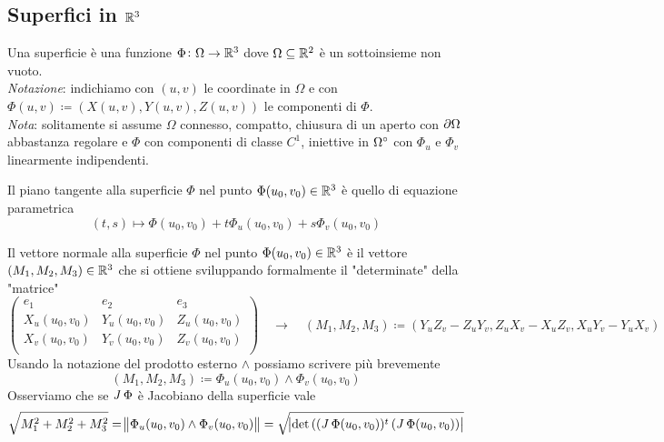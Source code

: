 
\subsection{Superfici in $ \mathbb{R}^3 $}
 
\begin{definition}[superficie]
	Una superficie è una funzione $ \Phi \colon \Omega \to \mathbb{R}^3 $ dove $ \Omega \subseteq \mathbb{R}^2 $ è un sottoinsieme non vuoto. \\
	\emph{Notazione}: indichiamo con $ (u, v) $ le coordinate in $ \Omega $ e con $ \Phi(u, v) \coloneqq (X(u, v), Y(u, v), Z(u, v)) $ le componenti di $ \Phi $.\\
	\emph{Nota}: solitamente si assume $ \Omega $ connesso, compatto, chiusura di un aperto con $ \partial{\Omega} $ abbastanza regolare e $ \Phi $ con componenti di classe $ C^1 $, iniettive in $ {\Omega}^{\circ} $ con $ \Phi_u $ e $ \Phi_v $ linearmente indipendenti. 
\end{definition}

\begin{definition}
	Il piano tangente alla superficie $ \Phi $ nel punto $ \Phi(u_0, v_0) \in \mathbb{R}^3 $ è quello di equazione parametrica 
	\begin{equation}
		(t, s) \mapsto \Phi(u_0, v_0) + t \Phi_u(u_0, v_0) + s \Phi_v(u_0, v_0)
	\end{equation}
\end{definition}

\begin{definition}
	Il vettore normale alla superficie $ \Phi $ nel punto $ \Phi(u_0, v_0) \in \mathbb{R}^3 $ è il vettore $ (M_1, M_2, M_3) \in \mathbb{R}^3 $ che si ottiene sviluppando formalmente il "determinate" della "matrice"
	\begin{equation*}
		\begin{pmatrix}
		e_1 & e_2 & e_3 \\
		X_u(u_0, v_0) & Y_u(u_0, v_0) & Z_u(u_0, v_0) \\
		X_v(u_0, v_0) & Y_v(u_0, v_0) & Z_v(u_0, v_0) \\
		\end{pmatrix}
		\quad \rightarrow \quad
		(M_1, M_2, M_3) \coloneqq (Y_uZ_v - Z_uY_v, Z_uX_v - X_uZ_v, X_uY_v - Y_uX_v)
	\end{equation*}
	Usando la notazione del prodotto esterno $ \wedge $ possiamo scrivere più brevemente
	\begin{equation}
		(M_1, M_2, M_3) \coloneqq \Phi_u(u_0, v_0) \wedge \Phi_v(u_0, v_0)
	\end{equation}
	Osserviamo che se $ \operatorname{\mathit{J}}{\Phi} $ è Jacobiano della superficie vale 
	\begin{equation}
		\sqrt{M_1^2 + M_2^2 + M_3^2} = \norm{\Phi_u(u_0, v_0) \wedge \Phi_v(u_0, v_0)} = \sqrt{\abs{\det{((\operatorname{\mathit{J}}{\Phi}(u_0, v_0))^t \, (\operatorname{\mathit{J}}{\Phi}(u_0, v_0))}}}
	\end{equation}
\end{definition}

